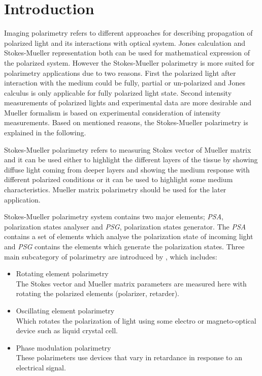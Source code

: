 \documentclass[oneside,a4,12p]{report} %
\begin{document}
\section{Introduction}
Imaging polarimetry refers to different approaches for describing propagation of polarized light and its interactions with optical system. Jones calculation and Stokes-Mueller representation both can be used for mathematical expression of the polarized system. However the Stokes-Mueller polarimetry is more suited for polarimetry applications due to two reasons. First the polarized light after interaction with the medium could be fully, partial or un-polarized and Jones calculus is only applicable for fully polarized light state. Second intensity measurements of polarized lights and experimental data are more desirable and Mueller formalism is based on experimental consideration of intensity measurements. Based on mentioned reasons, the Stokes-Mueller polarimetry is explained in the following. 

Stokes-Mueller polarimetry refers to measuring Stokes vector of Mueller matrix and it can be used either to highlight the different layers of the tissue by showing diffuse light coming from deeper layers and showing the medium response with different polarized conditions or it can be used to highlight some medium characteristics. Mueller matrix polarimetry should be used for the later application. 

 Stokes-Mueller polarimetry system contains two major elements; \textit{PSA}, polarization states analyser and \textit{PSG}, polarization states generator. The \textit{PSA} contains a set of elements which analyse the polarization state of incoming light and \textit{PSG} contains the elements which generate the polarization states. Three main subcategory of polarimetry are introduced by \cite{goldstein2003polarized}, which includes:
\begin{itemize}
	\item Rotating element polarimetry \\
	The Stokes vector and Mueller matrix parameters are measured here with rotating the polarized elements (polarizer, retarder). 	
	\item Oscillating element polarimetry \\
	Which rotates the polarization of light using some electro or magneto-optical device such as liquid crystal cell. 
	\item Phase modulation polarimetry \\
	These polarimeters use devices that vary in retardance in response to an electrical signal.
\end{itemize} 
\end{document}
